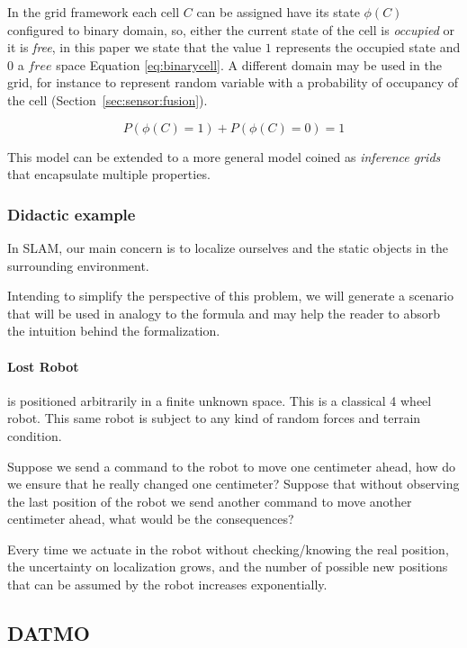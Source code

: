 In the grid framework each cell $C$ can be assigned have its state $\phi(C)$ configured to binary domain, so, either the current state of the cell is \textit{occupied} or it is \textit{free}, in this paper we state that the value $1$ represents the occupied state and $0$ a $free$ space Equation \ref{eq:binarycell}. A different domain may be used in the grid, for instance to represent random variable with a probability of occupancy of the cell (Section~\ref{sec:sensor:fusion}).

\begin{equation}
P(\phi(C)=1) + P(\phi(C)=0) = 1
\label{eq:binarycell}
\end{equation}

This model can be extended to a more general model coined as \textit{inference grids} that encapsulate multiple properties\cite{Elfes:1989:OGP:916528}.


\subsubsection{Didactic example}

In SLAM, our main concern is to localize ourselves and the static objects in the surrounding environment. 

Intending to simplify the perspective of this problem, we will generate a scenario that will be used in analogy to the formula and may help the reader to absorb the intuition behind the formalization.

\paragraph*{Lost Robot} is positioned arbitrarily in a finite unknown space. This is a classical 4 wheel robot. This same robot is subject to any kind of random forces and terrain condition. 

Suppose we send a command to the robot to move one centimeter ahead, how do we ensure that he really changed one centimeter? Suppose that without observing the last position of the robot we send another command to move another centimeter ahead, what would be the consequences? 

Every time we actuate in the robot without checking/knowing the real position, the uncertainty on localization grows, and the number of possible new positions that can be assumed by the robot increases exponentially.


\subsection{DATMO}


